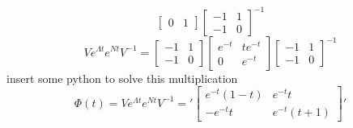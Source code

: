 \begin{enumerate}
\begin{equation}
\begin{bmatrix}
        0 & 1
      \end{bmatrix}
      \begin{bmatrix}
        -1 & 1 \\
        -1 & 0
      \end{bmatrix}^{-1}
    \end{equation}
    \begin{equation}
      Ve^{\Lambda t}e^{Nt}V^{-1} =
      \begin{bmatrix}
        -1 & 1 \\
        -1 & 0
      \end{bmatrix}
      \begin{bmatrix}
        e^{-t} & te^{-t} \\
        0 & e^{-t}
      \end{bmatrix}
      \begin{bmatrix}
        -1 & 1 \\
        -1 & 0
      \end{bmatrix}^{-1}
    \end{equation}
    insert some python to solve this multiplication
    \begin{equation}
      \Phi(t) = Ve^{\Lambda t}e^{Nt}V^{-1} =
      '\left[\begin{matrix}e^{-t} \left(1 - t\right) & e^{-t} t\\- e^{-t} t & e^{-t} \left(t + 1\right)\end{matrix}\right]'
    \end{equation}
    

\end{enumerate}
